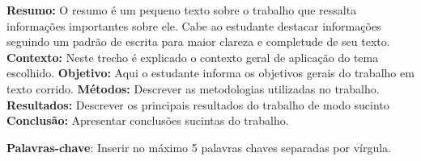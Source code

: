 \begin{resumo}


	
\textbf{Resumo:} O resumo é um pequeno texto sobre o trabalho que ressalta informações importantes sobre ele. Cabe ao estudante destacar informações seguindo um padrão de escrita para maior clareza e completude de seu texto. \textbf{Contexto:} Neste trecho é explicado o contexto geral de aplicação do tema escolhido. \textbf{Objetivo:} Aqui o estudante informa os objetivos gerais do trabalho em texto corrido. \textbf{Métodos:} Descrever as metodologias utilizadas no trabalho. \textbf{Resultados:} Descrever os principais resultados do trabalho de modo sucinto \textbf{Conclusão:} Apresentar conclusões sucintas do trabalho.

	\vspace{\onelineskip}
	
	\textbf{Palavras-chave}: Inserir no máximo 5 palavras chaves separadas por vírgula.
	
\end{resumo}